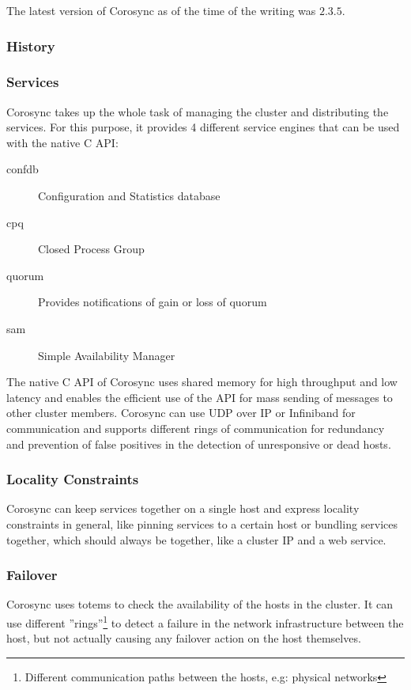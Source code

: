 The latest version of Corosync as of the time of the writing was $2.3.5$.
\subsubsection{History}
\subsubsection{Services}
Corosync takes up the whole task of managing the cluster and distributing the services. For this purpose, it provides 4 different service engines that can be used with the native C \ac{API}:
\begin{description}
\item [confdb] Configuration and Statistics database
\item [cpq] Closed Process Group
\item [quorum] Provides notifications of gain or loss of quorum
\item [sam] Simple Availability Manager
\end{description}
The native C API of Corosync uses shared memory for high throughput and low 
latency and enables the efficient use of the API for mass sending of messages to 
other cluster members.
\linebreak[3]
Corosync can use \ac{UDP} over IP or Infiniband for communication and supports different 
rings of communication for redundancy and prevention of false positives in the 
detection of unresponsive or dead hosts.
\subsubsection{Locality Constraints}
Corosync can keep services together on a single host and express locality constraints in general,
like pinning services to a certain host or bundling services together, which should
always be together, like a cluster IP and a web service.
\subsubsection{Failover}
Corosync uses totems\cite{Amir95thetotem} to check the availability of the hosts
in the cluster. It can use different ''rings''\footnote{Different communication
paths between the hosts, e.g: physical networks} to detect a failure
in the network infrastructure between the host, but not actually causing any failover
action on the host themselves.

